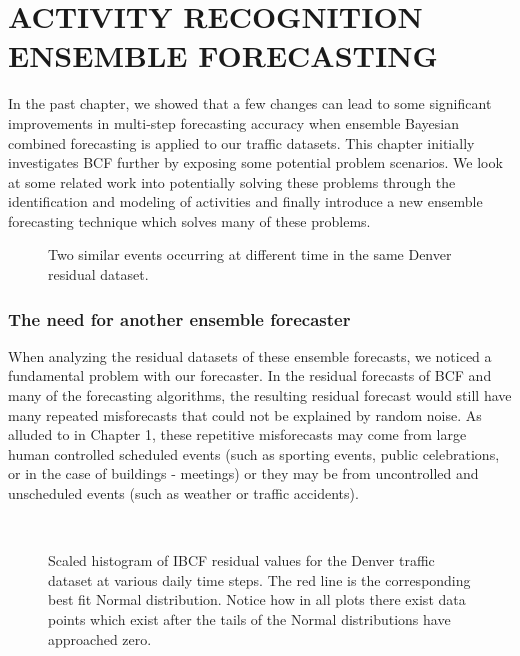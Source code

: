 \chapter{ACTIVITY RECOGNITION ENSEMBLE FORECASTING}
In the past chapter, we showed that a few changes can lead to some significant improvements in multi-step forecasting accuracy when ensemble Bayesian combined forecasting is applied to our traffic datasets.  This chapter initially investigates BCF further by exposing some potential problem scenarios.  We look at some related work into potentially solving these problems through the identification and modeling of activities and finally introduce a new ensemble forecasting technique which solves many of these problems.  

\begin{figure}[!b]
	\begin{center}
	\end{center}
	\caption{Two similar events occurring at different time in the same Denver residual dataset.}
	\label{fig:sample_residual_events}
\end{figure}


\subsection{The need for another ensemble forecaster}
When analyzing the residual datasets of these ensemble forecasts, we noticed a fundamental problem with our forecaster.  In the residual forecasts of BCF and many of the forecasting algorithms, the resulting residual forecast would still have many repeated misforecasts that could not be explained by random noise.  As alluded to in Chapter 1, these repetitive misforecasts may come from large human controlled scheduled events (such as sporting events, public celebrations, or in the case of buildings - meetings) or they may be from uncontrolled and unscheduled events (such as weather or traffic accidents).  

\begin{figure}[!t]
	\begin{center}
		 \\
	\end{center}
	\caption{Scaled histogram of IBCF residual values for the Denver traffic dataset at various daily time steps.  The red line is the corresponding best fit Normal distribution.  Notice how in all plots there exist data points which exist after the tails of the Normal distributions have approached zero.}
	\label{fig:denver_bcf_residual}
\end{figure}

